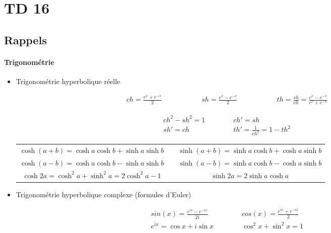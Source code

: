 \section{TD 16}



\subsection{Rappels}


\paragraph{Trigonométrie}

\begin{itemize}[label=]

	\item Trigonométrie hyperbolique réelle

	\[
		\begin{aligned}
			ch=\frac{e^x+e^{-x}}{2} &&&&&&&  
			sh=\frac{e^x-e^{-x}}{2} &&&&&&&
			th=\frac{sh}{ch}=\frac{e^x-e^{-x}}{e^x+e^{-x}}
		\end{aligned}
	\]

	\begin{align*}
		ch^2-sh^2=1  &&&&& ch'=sh \\
		sh'=ch &&&&& th'=\frac{1}{ch^2}=1-th^2
	\end{align*}

	\noindent

	\begin{tabular}{ccc}
		$\cosh\left(  a+b\right)  =\cosh a\cosh b+\sinh a\sinh b$ &  & $\sinh\left(a+b\right)  =\sinh a\cosh b+\cosh a\sinh b$\\
		$\cosh\left(  a-b\right)  =\cosh a\cosh b-\sinh a\sinh b$ &  & $\sinh\left(a-b\right)  =\sinh a\cosh b-\cosh a\sinh b$\\
		$\cosh2a=\cosh^{2}a+\sinh^{2}a=2\cosh^{2}a-1$ &  & $\sinh2a=2\sinh a\cosh a$
	\end{tabular}

	\vspace{12pt}

	\item Trigonométrie hyperbolique complexe (formules d'Euler)

	\begin{align*}
		sin(x)= \frac{e^{ix}-e^{-ix}}{2i} &&&&& cos(x)=\frac{e^{ix}+e^{-ix}}{2} \\
		e^{ix}= \cos x+i\sin x &&&&& \cos^2 x+\sin^2 x=1
	\end{align*}

\end{itemize}


